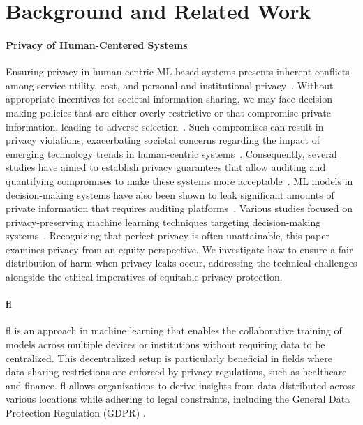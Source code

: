 \section{Background and Related Work}
\label{sec:related}

\paragraph{\textbf{Privacy of Human-Centered Systems}}
Ensuring privacy in human-centric ML-based systems presents inherent conflicts among service utility, cost, and personal and institutional privacy~\cite{sztipanovits2019science}. Without appropriate incentives for societal information sharing, we may face decision-making policies that are either overly restrictive or that compromise private information, leading to adverse selection~\cite{jin2016enabling}. Such compromises can result in privacy violations, exacerbating societal concerns regarding the impact of emerging technology trends in human-centric systems~\cite{mulligan2016privacy,fox2021exploring,goldfarb2012shifts}. Consequently, several studies have aimed to establish privacy guarantees that allow auditing and quantifying compromises to make these systems more acceptable~\cite{jagielski2020auditing, raji2020saving}. ML models in decision-making systems have also been shown to leak significant amounts of private information that requires auditing platforms~\cite{hamon2022bridging}. Various studies focused on privacy-preserving machine learning techniques targeting decision-making systems~\cite{abadi2016deep, cummings2019compatibility, taherisadr2023adaparl, taherisadr2024hilt}. Recognizing that perfect privacy is often unattainable, this paper examines privacy from an equity perspective. We investigate how to ensure a fair distribution of harm when privacy leaks occur, addressing the technical challenges alongside the ethical imperatives of equitable privacy protection.


\paragraph{\textbf{\acf{fl}}}
\ac{fl} is an approach in machine learning that enables the collaborative training of models across multiple devices or institutions without requiring data to be centralized. This decentralized setup is particularly beneficial in fields where data-sharing restrictions are enforced by privacy regulations, such as healthcare and finance. \ac{fl} allows organizations to derive insights from data distributed across various locations while adhering to legal constraints, including the General Data Protection Regulation (GDPR) \cite{BG_Survey2,BG_Survey1}.

